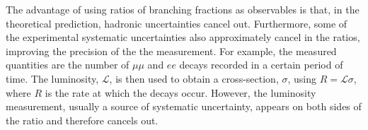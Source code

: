 
The advantage of using ratios of branching fractions as observables is that, in the theoretical prediction, hadronic 
uncertainties cancel out. Furthermore, some of the experimental systematic uncertainties also approximately cancel in 
the ratios, improving the precision of the the measurement. For example, the measured quantities are the number of 
$\mu\mu$ and $ee$ decays recorded in a certain period of time. The luminosity, $\mathcal{L}$, is then used to obtain a
cross-section, $\sigma$, using $R = \mathcal{L}\sigma$, where $R$ is the rate at which the decays occur. 
However, the luminosity measurement, usually a source of systematic uncertainty, appears on both
sides of the ratio and therefore cancels out.

